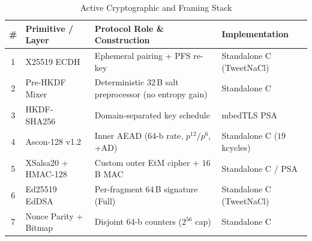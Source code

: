 \documentclass[conference]{IEEEtran}
\renewcommand{\arraystretch}{0.96}
\begin{document}
\begin{table}[t]
\centering
\caption{Active Cryptographic and Framing Stack}
\label{tab:crypto_stack}
\setlength{\tabcolsep}{3pt}
\scriptsize
\renewcommand{\arraystretch}{0.98}
\begin{tabularx}{\columnwidth}{@{}clXl@{}}
\toprule
\textbf{\#} & \textbf{Primitive / Layer} & \textbf{Protocol Role \& Construction} & \textbf{Implementation} \\
\midrule
1 & X25519 ECDH~\cite{rfc7748} & Ephemeral pairing + PFS re-key & Standalone C (TweetNaCl) \\
2 & Pre-HKDF Mixer & Deterministic 32\,B salt preprocessor (no entropy gain) & Standalone C \\
3 & HKDF-SHA256~\cite{rfc5869} & Domain-separated key schedule & mbedTLS PSA \\
4 & Ascon-128 v1.2~\cite{dobraunig2021} & Inner AEAD ($64$-b rate, $p^{12}/p^6$, +AD) & Standalone C ($19$\,kcycles) \\
5 & XSalsa20 + HMAC-128 & Custom outer EtM cipher + $16$\,B MAC & Standalone C / PSA \\
6 & Ed25519 EdDSA~\cite{bernstein2012} & Per-fragment $64$\,B signature (Full) & Standalone C (TweetNaCl) \\
7 & Nonce Parity + Bitmap & Disjoint 64-b counters ($2^{56}$ cap) & Standalone C \\
\bottomrule
\end{tabularx}
\end{table}
\end{document}
